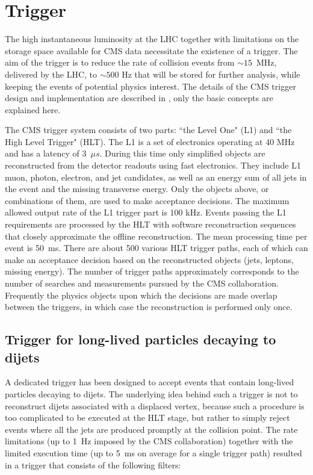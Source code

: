 \section{Trigger}

The high instantaneous luminosity at the LHC together with limitations on the storage space available for
CMS data necessitate the existence of a trigger.
 The aim of the trigger is to reduce the rate
of collision events from $\sim15$~MHz, delivered by the LHC, to $\sim500$ Hz that will be stored
for further analysis, while keeping the events of potential physics interest.
The details of the CMS trigger design and implementation are described in \cite{Cittolin:578006},
only the basic concepts are explained here. 

The CMS trigger system consists of two parts: ``the Level One" (L1) and ``the High Level Trigger" (HLT).
The L1 is a set of electronics operating at 40 MHz and has a latency of 3~$\mu s$. During this
time only simplified 
objects are reconstructed from the detector readouts using fast electronics.
 They include L1 muon, photon, 
electron, and jet candidates, as well as an energy sum of all jets in the event 
and the missing transverse energy.
Only the objects above, or combinations of them, are used to make acceptance decisions. 
The maximum allowed output
rate of the L1 trigger part is 100 kHz. Events passing the L1 requirements are processed by the
HLT with 
software reconstruction sequences that closely approximate
the offline reconstruction. The mean processing time per event is 50~ms. 
There are about 
500 various HLT trigger paths, each of which can make an acceptance decision based 
on the reconstructed objects
(jets, leptons, missing energy). The number of trigger paths approximately corresponds to the
number of searches and measurements pursued by the CMS collaboration.
Frequently the physics objects
upon which the decisions are made overlap between the triggers, in which case the reconstruction 
is performed only once.


\subsection{Trigger for long-lived particles decaying to dijets}
\label{subsec:trigger}

A dedicated trigger has been designed to accept events that contain long-lived particles 
decaying to dijets. 
The underlying idea behind such a trigger is not to reconstruct dijets
associated with a displaced vertex, because such a procedure is too complicated to be executed 
at the HLT stage, but rather to simply reject events where all the jets are produced promptly at the collision
point. The rate limitations (up to 1~Hz imposed by the CMS collaboration)
 together with the limited execution time (up to 5~ms on average for a single trigger path)
resulted in a trigger that consists of the following filters:

